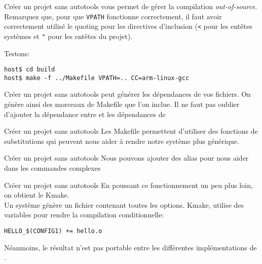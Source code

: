 \begin{frame}[fragile=singleslide]{Créer un projet sans autotools}
   vous permet de gérer la compilation \emph{out-of-source}.
  Remarquez que, pour que \verb+VPATH+ fonctionne correctement, il faut avoir
  correctement utilisé le quoting pour les directives d'inclusion (\verb+<+ pour
  les entêtes systèmes et \verb+"+ pour les entêtes du projet).

  Testons:
\begin{lstlisting}
host$ cd build
host$ make -f ../Makefile VPATH=.. CC=arm-linux-gcc
\end{lstlisting} %
\end{frame}

\begin{frame}[fragile=singleslide]{Créer un projet sans autotools}
   peut  générer les dépendances de vos  fichiers.  On génère
  ainsi  des morceaux  de Makefile  que l'on  inclue. Il  ne  faut pas
  oublier   d'ajouter  la  dépendance   entre     et  les
  dépendances de 
  
\end{frame}

\begin{frame}[fragile=singleslide]{Créer un projet sans autotools}
  Les  Makefile permettent d'utiliser  des fonctions  de substitutions
  qui  peuvent  nous aider  à  rendre  notre  système plus  générique.
  
\end{frame}

\begin{frame}[fragile=singleslide]{Créer un projet sans autotools}
  Nous pouvons  ajouter des alias  pour nous aider dans  les commandes
  complexes
  
\end{frame}


\begin{frame}[fragile=singleslide]{Créer un projet sans autotools}
  En poussant ce fonctionnement un peu plus loin, on obtient le Kmake.\\
  Un système  génère un fichier contenant toutes  les options.  Kmake,
  utilise des variables pour rendre la compilation conditionnelle:
\begin{lstlisting}
HELLO_$(CONFIG1) += hello.o
\end{lstlisting}
  Néanmoins,  le résultat  n'est  pas portable  entre les  différentes
  implémentations de .
\end{frame}

